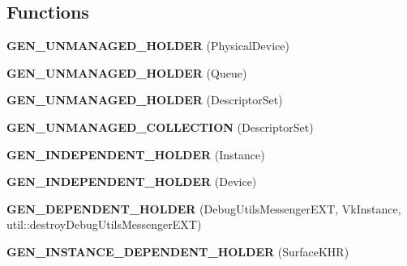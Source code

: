 \subsection*{Functions}
\begin{DoxyCompactItemize}
\item 
\mbox{\label{namespaceblaze_1_1vkw_a3c8c3c7066b1e6f0abdbbebf5a1e5bb2}} 
{\bfseries G\+E\+N\+\_\+\+U\+N\+M\+A\+N\+A\+G\+E\+D\+\_\+\+H\+O\+L\+D\+ER} (Physical\+Device)
\item 
\mbox{\label{namespaceblaze_1_1vkw_a15c3fd8b4789817c0a7ffc238ecba181}} 
{\bfseries G\+E\+N\+\_\+\+U\+N\+M\+A\+N\+A\+G\+E\+D\+\_\+\+H\+O\+L\+D\+ER} (Queue)
\item 
\mbox{\label{namespaceblaze_1_1vkw_a0a43f36ff522aa206adc95d209ef8fa8}} 
{\bfseries G\+E\+N\+\_\+\+U\+N\+M\+A\+N\+A\+G\+E\+D\+\_\+\+H\+O\+L\+D\+ER} (Descriptor\+Set)
\item 
\mbox{\label{namespaceblaze_1_1vkw_a0c8fcb0b711b123190ccb0adf217b108}} 
{\bfseries G\+E\+N\+\_\+\+U\+N\+M\+A\+N\+A\+G\+E\+D\+\_\+\+C\+O\+L\+L\+E\+C\+T\+I\+ON} (Descriptor\+Set)
\item 
\mbox{\label{namespaceblaze_1_1vkw_a2cbd10674d01b725d6c0d81046edc617}} 
{\bfseries G\+E\+N\+\_\+\+I\+N\+D\+E\+P\+E\+N\+D\+E\+N\+T\+\_\+\+H\+O\+L\+D\+ER} (Instance)
\item 
\mbox{\label{namespaceblaze_1_1vkw_a10d71502f5614fd815954a45af24b17c}} 
{\bfseries G\+E\+N\+\_\+\+I\+N\+D\+E\+P\+E\+N\+D\+E\+N\+T\+\_\+\+H\+O\+L\+D\+ER} (Device)
\item 
\mbox{\label{namespaceblaze_1_1vkw_a45bba3c2db5f2aafbf54249082342aa9}} 
{\bfseries G\+E\+N\+\_\+\+D\+E\+P\+E\+N\+D\+E\+N\+T\+\_\+\+H\+O\+L\+D\+ER} (Debug\+Utils\+Messenger\+E\+XT, Vk\+Instance, util\+::destroy\+Debug\+Utils\+Messenger\+E\+XT)
\item 
\mbox{\label{namespaceblaze_1_1vkw_aa2a1cb7ba4f7f337795c3bbc83dd2f4e}} 
{\bfseries G\+E\+N\+\_\+\+I\+N\+S\+T\+A\+N\+C\+E\+\_\+\+D\+E\+P\+E\+N\+D\+E\+N\+T\+\_\+\+H\+O\+L\+D\+ER} (Surface\+K\+HR)

\end{DoxyCompactItemize}
